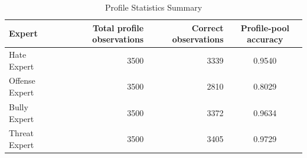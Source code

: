 
\begin{table}[htbp]
\centering
\caption{Profile Statistics Summary}
\label{tab:profile-statistics-summary}
\small
\begin{tabular}{p{2.8cm} r r c}
\toprule
Expert & Total profile observations & Correct observations & Profile-pool accuracy \\
\midrule
Hate Expert & 3500 & 3339 & 0.9540 \\
Offense Expert & 3500 & 2810 & 0.8029 \\
Bully Expert & 3500 & 3372 & 0.9634 \\
Threat Expert & 3500 & 3405 & 0.9729 \\
\bottomrule
\end{tabular}
\end{table}
